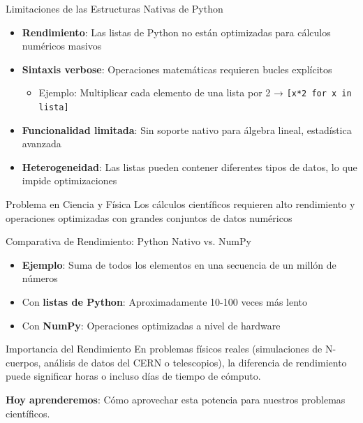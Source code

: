 \documentclass[10pt]{beamer}
\begin{document}
\begin{frame}{Limitaciones de las Estructuras Nativas de Python}
  \begin{itemize}
    \item \textbf{Rendimiento}: Las listas de Python no están optimizadas para cálculos numéricos masivos
    \item \textbf{Sintaxis verbose}: Operaciones matemáticas requieren bucles explícitos
      \begin{itemize}
        \item Ejemplo: Multiplicar cada elemento de una lista por 2 → \texttt{[x*2 for x in lista]}
      \end{itemize}
    \item \textbf{Funcionalidad limitada}: Sin soporte nativo para álgebra lineal, estadística avanzada
    \item \textbf{Heterogeneidad}: Las listas pueden contener diferentes tipos de datos, lo que impide optimizaciones
  \end{itemize}
  
  \begin{alertblock}{Problema en Ciencia y Física}
    Los cálculos científicos requieren alto rendimiento y operaciones optimizadas con grandes conjuntos de datos numéricos
  \end{alertblock}
\end{frame}

\begin{frame}{Comparativa de Rendimiento: Python Nativo vs. NumPy}
  \begin{itemize}
    \item \textbf{Ejemplo}: Suma de todos los elementos en una secuencia de un millón de números
    \item Con \textbf{listas de Python}: Aproximadamente 10-100 veces más lento
    \item Con \textbf{NumPy}: Operaciones optimizadas a nivel de hardware
  \end{itemize}
  
  \begin{alertblock}{Importancia del Rendimiento}
    En problemas físicos reales (simulaciones de N-cuerpos, análisis de datos del CERN o telescopios), la diferencia de rendimiento puede significar horas o incluso días de tiempo de cómputo.
  \end{alertblock}
  
  \textbf{Hoy aprenderemos}: Cómo aprovechar esta potencia para nuestros problemas científicos.
\end{frame}
\end{document}
